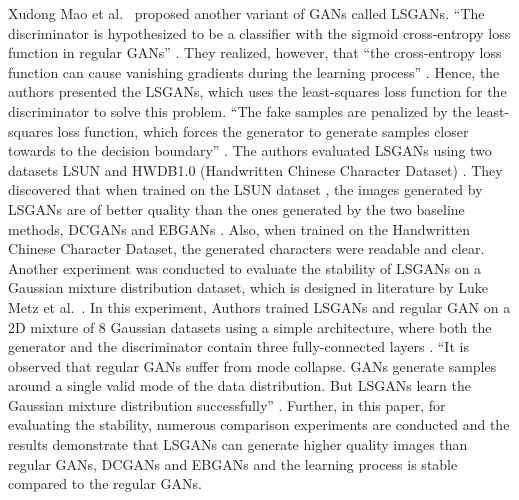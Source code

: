 Xudong Mao et al.\ \cite{mao2017squares} proposed another variant of \acp{GAN} called \acp{LSGAN}. ``The discriminator is hypothesized to be a classifier with the sigmoid cross-entropy loss function in regular \acp{GAN}'' \cite{mao2017squares}. They realized, however, that ``the cross-entropy loss function can cause vanishing gradients during the learning process'' \cite{mao2017squares}. Hence, the authors presented the \acp{LSGAN}, which uses the least-squares loss function for the discriminator to solve this problem. ``The fake samples are penalized by the least-squares loss function, which forces the generator to generate samples closer towards to the decision boundary'' \cite{mao2017squares}. The authors evaluated \acp{LSGAN} using two datasets LSUN \cite{yu2016lsun} and HWDB1.0 (Handwritten Chinese Character Dataset) \cite{6065551}. They discovered that when trained on the LSUN dataset \cite{yu2016lsun}, the images generated by \acp{LSGAN} are of better quality than the ones generated by the two baseline methods, \acp{DCGAN} \cite{radford2016unsupervised} and EBGANs \cite{zhao2017energybased}. Also, when trained on the Handwritten Chinese Character Dataset, the generated characters were readable and clear. Another experiment was conducted to evaluate the stability of \acp{LSGAN} on a Gaussian mixture distribution dataset, which is designed in literature by Luke Metz et al.\ \cite{metz2017unrolled}. In this experiment, Authors trained \acp{LSGAN} and regular \ac{GAN} on a 2D mixture of 8 Gaussian datasets using a simple architecture, where both the generator and the discriminator contain three fully-connected layers \cite{mao2017squares}. ``It is observed that regular \acp{GAN} suffer from mode collapse. \acp{GAN} generate samples around a single valid mode of the data distribution. But \acp{LSGAN} learn the Gaussian mixture distribution successfully'' \cite{mao2017squares}. Further, in this paper, for evaluating the stability, numerous comparison experiments are conducted and the results demonstrate that \acp{LSGAN} can generate higher quality images than regular \acp{GAN}, \acp{DCGAN} \cite{radford2016unsupervised} and \acp{EBGAN} \cite{zhao2017energybased} and the learning process is stable compared to the regular \acp{GAN}.


